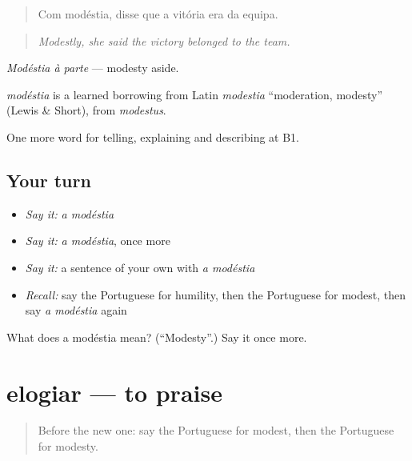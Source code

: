 \begin{quote}
Com modéstia, disse que a vitória era da equipa.
\end{quote}

\begin{quote}
\emph{Modestly, she said the victory belonged to the team.}
\end{quote}

\emph{Modéstia à parte} — modesty aside.

\begin{cousinweb}
\emph{modéstia} is a learned borrowing from Latin \emph{modestia} \textquotedblleft{}moderation, modesty\textquotedblright{} (Lewis \& Short), from \emph{modestus}.
\end{cousinweb}

\begin{grammarlens}[title={What you've built}]
One more word for telling, explaining and describing at B1.
\end{grammarlens}

\subsection*{Your turn}
\begin{itemize}
\raggedright
  \item \emph{Say it:} \emph{a modéstia}
  \item \emph{Say it:} \emph{a modéstia}, once more
  \item \emph{Say it:} a sentence of your own with \emph{a modéstia}
  \item \emph{Recall:} say the Portuguese for humility, then the Portuguese for modest, then say \emph{a modéstia} again
\end{itemize}

\begin{tcolorbox}[breakable,colback=teal!4,colframe=teal!35!black,title={Before you move on}]
What does a modéstia mean? (\textquotedblleft{}Modesty\textquotedblright{}.) Say it once more.
\end{tcolorbox}
\section[elogiar]{elogiar — to praise}

\label{lesson:PT-C470-elogiar}



\begin{quote}
Before the new one: say the Portuguese for modest, then the Portuguese for modesty.
\end{quote}

